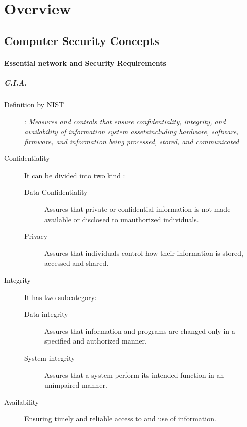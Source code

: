 \documentclass{article}
\begin{document}
\tableofcontents
\newpage
\section{Overview}
    \subsection{Computer Security Concepts}
        \paragraph{Essential network and Security Requirements}
           
            \subparagraph{C.I.A.}
                \begin{description}
                    \item[Definition by NIST]: \textit{Measures and controls that ensure confidentiality, integrity, and availability of information system assetsincluding hardware, software, firmware, and information being processed, stored, and communicated}

                \end{description}
            
                \begin{description}
                    \item[Confidentiality]  It can be divided into two kind : 
                            \begin{description}
                                \item[Data Confidentiality] Assures that private or confidential information is not made available or disclosed to unauthorized individuals.
                                \item[Privacy] Assures that individuals control how their information is stored, accessed and shared. 
                            \end{description}
                    \item[Integrity]  It has two subcategory: 
                           \begin{description}
                                \item[Data integrity] Assures that information and programs are changed only in a specified and authorized manner. 
                                \item[System integrity] Assures that a system perform its intended function in an unimpaired manner. 
                            \end{description}
                    
                    \item[Availability] Ensuring timely and reliable access to and use of information.
                           
                \end{description}
\end{document}
